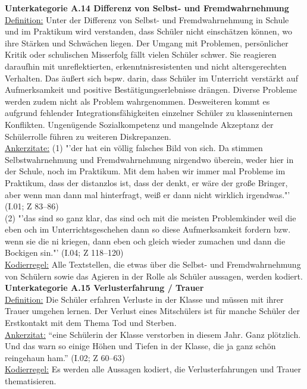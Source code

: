 \noindent
\textbf{Unterkategorie A.14 Differenz von Selbst- und Fremdwahrnehmung}\\
\underline{Definition:} Unter der Differenz von Selbst- und Fremdwahrnehmung in Schule und im Praktikum wird verstanden, dass Schüler nicht einschätzen können, wo ihre Stärken und Schwächen liegen. Der Umgang mit Problemen, persönlicher Kritik oder schulischen Misserfolg fällt vielen Schüler schwer. Sie reagieren daraufhin mit unreflektierten, erkenntnisresistenten und nicht altersgerechten Verhalten. Das äußert sich bspw. darin, dass Schüler im Unterricht verstärkt auf Aufmerksamkeit und positive Bestätigungserlebnisse drängen. Diverse Probleme werden zudem nicht als Problem wahrgenommen. Desweiteren kommt es aufgrund fehlender Integrationsfähigkeiten einzelner Schüler zu klasseninternen Konflikten. Ungenügende Sozialkompetenz und mangelnde Akzeptanz der Schülerrolle führen zu weiteren Diskrepanzen.\\
\underline{Ankerzitate:} (1) "'der hat ein völlig falsches Bild von sich. Da stimmen Selbstwahrnehmung und Fremdwahrnehmung nirgendwo überein, weder hier in der Schule, noch im Praktikum. Mit dem haben wir immer mal Probleme im Praktikum, dass der distanzlos ist, dass der denkt, er wäre der große Bringer, aber wenn man dann mal hinterfragt, weiß er dann nicht wirklich irgendwas."' (I.01; Z 83--86)\\ (2) "'das sind so ganz klar, das sind och mit die meisten Problemkinder weil die eben och im Unterrichtsgeschehen dann so diese Aufmerksamkeit fordern bzw.  wenn sie die ni kriegen, dann eben och gleich wieder zumachen und dann die Bockigen sin."' (I.04; Z 118--120)\\
\underline{Kodierregel:} Alle Textstellen, die etwas über die Selbst- und Fremdwahrnehmung von Schülern sowie das Agieren in der Rolle als Schüler aussagen, werden kodiert.\\

\noindent
\textbf{Unterkategorie A.15 Verlusterfahrung / Trauer}\\
\underline{Definition:} Die Schüler erfahren Verluste in der Klasse und müssen mit ihrer Trauer umgehen lernen. Der Verlust eines Mitschülers ist für manche Schüler der Erstkontakt mit dem Thema Tod und Sterben.\\
\underline{Ankerzitat:} "`eine Schülerin der Klasse verstorben in diesem Jahr. Ganz plötzlich. Und das warn so einige Höhen und Tiefen in der Klasse, die ja ganz schön reingehaun ham."' (I.02; Z 60--63)\\
\underline{Kodierregel:} Es werden alle Aussagen kodiert, die Verlusterfahrungen und Trauer thematisieren.\\

